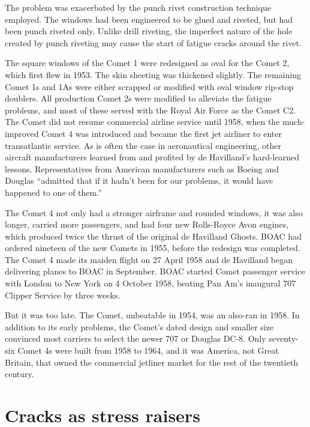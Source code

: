 \documentclass{AeroStructure-ERJohnson}
\begin{document}
The problem was exacerbated by the punch rivet construction technique employed. The windows had been engineered to be glued and riveted, but had been punch riveted only. Unlike drill riveting, the imperfect nature of the hole created by punch riveting may cause the start of fatigue cracks around the rivet.

The square windows of the Comet 1 were redesigned as oval for the Comet 2, which first flew in 1953. The skin sheeting was thickened slightly. The remaining Comet 1s and 1As were either scrapped or modified with oval window rip-stop doublers. All production Comet 2s were modified to alleviate the fatigue problems, and most of these served with the Royal Air Force as the Comet C2. The Comet did not resume commercial airline service until 1958, when the much-improved Comet 4 was introduced and became the first jet airliner to enter transatlantic service. As is often the case in aeronautical engineering, other aircraft manufacturers learned from and profited by de Havilland's hard-learned lessons. Representatives from American manufacturers such as Boeing and Douglas ``admitted that if it hadn't been for our problems, it would have happened to one of them.''

The Comet 4 not only had a stronger airframe and rounded windows, it was also longer, carried more passengers, and had four new Rolls-Royce Avon engines, which produced twice the thrust of the original de Havilland Ghosts. BOAC had ordered nineteen of the new Comets in 1955, before the redesign was completed. The Comet 4 made its maiden flight on 27 April 1958 and de Havilland began delivering planes to BOAC in\vadjust{\vspace*{2pt}\pagebreak} September. BOAC started Comet passenger service with London to New York on 4 October 1958, beating Pan Am's inaugural 707 Clipper Service by three weeks.

But it was too late. The Comet, unbeatable in 1954, was an also-ran in 1958. In addition to its early problems, the Comet's dated design and smaller size convinced most carriers to select the newer 707 or Douglas DC-8. Only seventy-six Comet 4s were built from 1958 to 1964, and it was America, not Great Britain, that owned the commercial jetliner market for the rest of the twentieth century.

\section{Cracks as stress raisers}\label{sec13.2}
\end{document}
